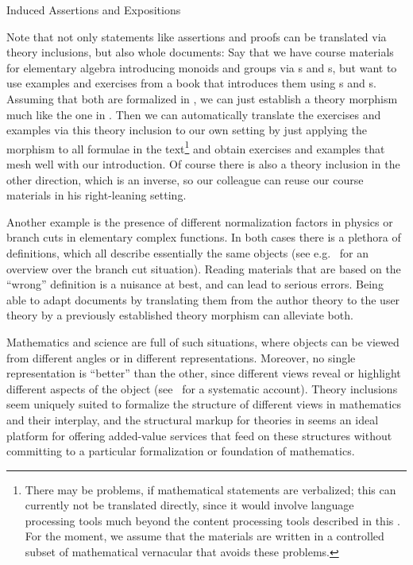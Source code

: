 \begin{omgroup}[id=complex-theories,short=Complex Theories,
                            creators=miko,contributors=frabe]
\begin{omgroup}[id=induced-assertions,short=Induced Assertions]{Induced Assertions and
  Expositions}
\begin{module}[id=assertionvia]
Note that not only statements like assertions and proofs can be translated via theory
inclusions, but also whole documents: Say that we have course materials for elementary
algebra introducing monoids and groups via {s} and
{s}, but want to use examples and exercises from a book that
introduces them using {s} and {s}. Assuming
that both are formalized in {\omdoc}, we can just establish a theory morphism much like
the one in {}. Then we can automatically translate the
exercises and examples via this theory inclusion to our own setting by just applying the
morphism to all formulae in the text\footnote{There may be problems, if mathematical
  statements are verbalized; this can currently not be translated directly, since it would
  involve language processing tools much beyond the content processing tools described in
  this {\report}. For the moment, we assume that the materials are written in a controlled
  subset of mathematical vernacular that avoids these problems.}  and obtain exercises and
examples that mesh well with our introduction. Of course there is also a theory inclusion
in the other direction, which is an inverse, so our colleague can reuse our course
materials in his right-leaning setting.

Another example is the presence of different normalization factors in physics or branch
cuts in elementary complex functions. In both cases there is a plethora of definitions,
which all describe essentially the same objects (see e.g.~\cite{BraCor:raefca02} for an
overview over the branch cut situation). Reading materials that are based on the ``wrong''
definition is a nuisance at best, and can lead to serious errors. Being able to adapt
documents by translating them from the author theory to the user theory by a previously
established theory morphism can alleviate both.

Mathematics and science are full of such situations, where objects can be viewed from
different angles or in different representations. Moreover, no single representation is
``better'' than the other, since different views reveal or highlight different aspects of
the object (see~\cite{KohKoh:esmk05} for a systematic account). Theory inclusions seem
uniquely suited to formalize the structure of different views in mathematics and their
interplay, and the structural markup for theories in {\omdoc} seems an ideal platform for
offering added-value services that feed on these structures without committing to a
particular formalization or foundation of mathematics.
\end{module}
\end{omgroup}


\end{omgroup}
